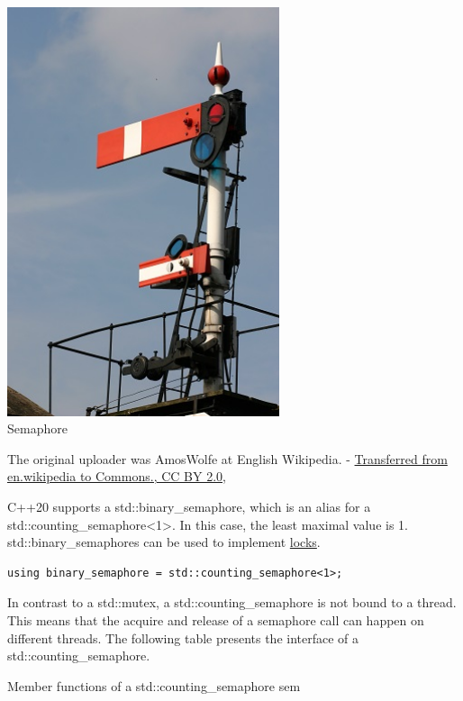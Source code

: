 \begin{center}
\includegraphics[width=0.6\textwidth]{content/3/chapter6/images/16.png}\\
Semaphore
\end{center}

The original uploader was AmosWolfe at English Wikipedia. - \href{https://commons.wikimedia.org/w/index.php?curid=1972304}{Transferred from en.wikipedia to Commons., CC BY 2.0,}

C++20 supports a std::binary\_semaphore, which is an alias for a std::counting\_semaphore<1>. In this case, the least maximal value is 1. std::binary\_semaphores can be used to implement \href{https://en.cppreference.com/w/cpp/named_req/BasicLockable}{locks}.

\begin{lstlisting}[style=styleCXX]
using binary_semaphore = std::counting_semaphore<1>;
\end{lstlisting}

In contrast to a std::mutex, a std::counting\_semaphore is not bound to a thread. This means that the acquire and release of a semaphore call can happen on different threads. The following table presents the interface of a std::counting\_semaphore.

\begin{center}
Member functions of a std::counting\_semaphore sem
\end{center}

